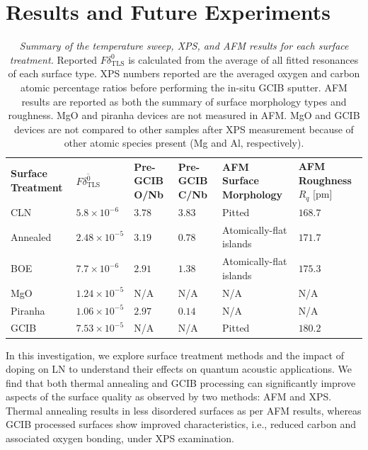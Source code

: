 \documentclass[
 prapplied,
 amsmath,amssymb,
 reprint, longbibliography, superscriptaddress
]{revtex4-2}
\begin{document}
\section{Results and Future Experiments}

\begin{table}[ht]
\caption{\emph{Summary of the temperature sweep, XPS, and AFM results for each surface treatment.} Reported $F \delta^0_\text{TLS}$ is calculated from the average of all fitted resonances of each surface type. XPS numbers reported are the averaged oxygen and carbon atomic percentage ratios before performing the in-situ GCIB sputter. AFM results are reported as both the summary of surface morphology types and roughness. MgO and piranha devices are not measured in AFM. MgO and GCIB devices are not compared to other samples after XPS measurement because of other atomic species present (Mg and Al, respectively).}
\centering
\begin{ruledtabular}
\begin{tabular}{l l l l l l}
\textbf{Surface Treatment} & \textbf{$\overline{F \delta^0_\text{TLS}}$} & \textbf{Pre-GCIB O/Nb}  & \textbf{Pre-GCIB C/Nb}  & \textbf{AFM Surface Morphology} & \textbf{AFM Roughness $R_q$} [pm]\\
CLN & $5.8\times 10^{-6}$ & $3.78$ & $3.83$ & Pitted & $168.7$ \\
Annealed & $2.48\times 10^{-5}$ & $3.19$ & $0.78$ & Atomically-flat islands & $171.7$ \\
BOE & $7.7\times 10^{-6}$ & $2.91$ & $1.38$ & Atomically-flat islands & $175.3$ \\
MgO & $1.24\times 10^{-5}$ & N/A & N/A & N/A & N/A \\
Piranha & $1.06\times 10^{-5}$ & $2.97$ & $0.14$ & N/A & N/A\\
GCIB & $7.53\times 10^{-5}$ & N/A & N/A & Pitted & $180.2$\\
\end{tabular}
\end{ruledtabular}
\end{table}


In this investigation, we explore surface treatment methods and the impact of doping on LN to understand their effects on quantum acoustic applications. We find that both thermal annealing and GCIB processing can significantly improve aspects of the surface quality as observed by two methods: AFM and XPS. Thermal annealing results in less disordered surfaces as per AFM results, whereas GCIB processed surfaces show improved characteristics, i.e., reduced carbon and associated oxygen bonding, under XPS examination.
\end{document}
